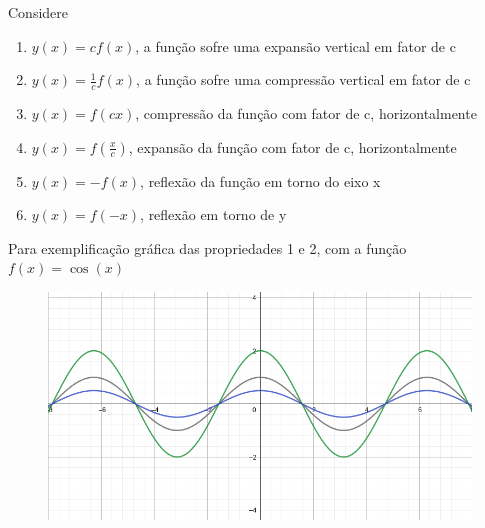 \begin{multicols*}{2}
            Considere 
            \begin{enumerate}
            \item $y(x) = cf(x)$, a função sofre uma expansão vertical em fator de c
            \item $y(x) = \frac{1}{c} f(x)$, a função sofre uma compressão vertical em fator de c
            \item $ y(x) = f(cx)$, compressão da função com fator de c, horizontalmente
            \item $y(x) = f(\frac{x}{c})$, expansão da função com fator de c, horizontalmente
            \item $y(x) = -f(x)$, reflexão da função em torno do eixo x
            \item $y(x)  = f(-x)$, reflexão em torno de y
            \end{enumerate}
            
            Para exemplificação gráfica das propriedades 1 e 2, com a função $f(x) = \cos(x)$
            \begin{figure}[H]
                \includegraphics[scale=0.3]{assets/rafael/img10.png}
            \end{figure}
                            

\end{multicols*}
